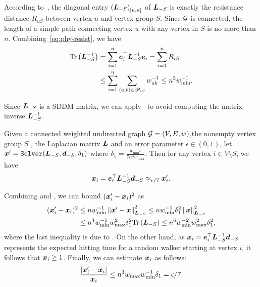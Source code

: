 \documentclass[10pt,twocolumn,twoside]{IEEEtran}
\begin{document}
\begin{IEEEproof}
    According to~\cite{ClPo11}, the diagonal entry \(\left( \boldsymbol{L}_{-S} \right)_{[u,u]}\) of \(\boldsymbol{L}_{-S}\) is exactly the resistance distance \(R_{uS}\) between vertex \(u\) and vertex group \(S\).
    Since \(\mathcal{G}\) is connected, the length of a simple path connecting vertex \(u\) with any vertex in \(S\) is no more than \(n\).
    Combining~\eqref{eq:phy-resist}, we have
    \begin{align*}
        \mathrm{Tr}\left(\boldsymbol{L}_{-S}^{-1}\right) & =\sum_{i=1}^n\boldsymbol{e}_i^\top\boldsymbol{L}_{-S}^{-1}\boldsymbol{e}_i=\sum_{i=1}^nR_{iS}              \\
                               & \le\sum_{i=1}^n\sum_{\left( a,b \right)\in\mathscr{P}_{iS}}w_{ab}^{-1}\le n^2w_{\min}^{-1}.
    \end{align*}
\end{IEEEproof}

Since \(\boldsymbol{L}_{-S}\) is a SDDM matrix, we can apply~ to avoid computing the matrix inverse \(\boldsymbol{L}_{-S}^{-1}\).
\begin{lemma}\label{lem:approx-numer}
    Given a connected weighted undirected graph \(\mathcal{G}=(V,E,w)\),the nonempty vertex group \(S\) , the Laplacian matrix \(\boldsymbol{L}\) and an error parameter \(\epsilon\in(0,1)\), let \(\boldsymbol{x}'=\mathtt{Solver}(\boldsymbol{L}_{-S},\boldsymbol{d}_{-S},\delta_1)\) where \(\delta_1=\frac{w_{\min}\epsilon}{7n^3w_{\max}}\). Then for any vertex \(i\in V\setminus S\), we have
    \begin{equation}\label{eq:approx-numer}
        \boldsymbol{x}_i=\boldsymbol{e}_i^\top\boldsymbol{L}_{-S}^{-1}\boldsymbol{d}_{-S}\approx_{\epsilon/7}\boldsymbol{x}'_i.
    \end{equation}
\end{lemma}
\begin{IEEEproof}
    Combining  and , we can bound \((\boldsymbol{x}'_i-\boldsymbol{x}_i)^2\) as
    \begin{align*}
        (\boldsymbol{x}'_i-\boldsymbol{x}_i)^2
         & \le nw_{\min}^{-1}\left\Vert\boldsymbol{x}'-\boldsymbol{x}\right\Vert^2_{\boldsymbol{L}_{-S}}
        \le nw_{\min}^{-1}\delta_1^2\left\Vert\boldsymbol{x}\right\Vert^2_{\boldsymbol{L}_{-S}}        \\
         & \le n^4w_{\min}^{-1}w_{\max}^2\delta_1^2\mathrm{Tr}\left(\boldsymbol{L}_{-S}\right)
        \le n^6w_{\min}^{-2}w_{\max}^2\delta_1^2,
    \end{align*}
    where the last inequality is due to .
    On the other hand, as \(\boldsymbol{x}_i=\boldsymbol{e}_i^\top\boldsymbol{L}_{-S}^{-1}\boldsymbol{d}_{-S}\) represents the expected hitting time for a random walker starting at vertex \(i\), it follows that \(\boldsymbol{x}_i\ge1\).
    Finally, we can estimate \(\boldsymbol{x}_i\) as follows:
    \begin{equation*}
        \frac{\left|\boldsymbol{x}'_i-\boldsymbol{x}_i \right|}{\boldsymbol{x}_i}\le n^3w_{\max}w_{\min}^{-1}\delta_1=\epsilon/7.
    \end{equation*}
\end{IEEEproof}
\end{document}
